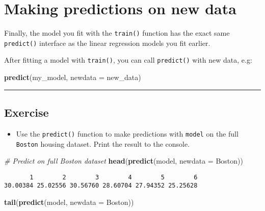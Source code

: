 \documentclass[]{book}
\newenvironment{Shaded}{\begin{snugshade}}{\end{snugshade}}
\newcommand{\KeywordTok}[1]{\textcolor[rgb]{0.13,0.29,0.53}{\textbf{#1}}}
\newcommand{\DataTypeTok}[1]{\textcolor[rgb]{0.13,0.29,0.53}{#1}}
\newcommand{\CommentTok}[1]{\textcolor[rgb]{0.56,0.35,0.01}{\textit{#1}}}
\newcommand{\NormalTok}[1]{#1}
\providecommand{\tightlist}{%
  \setlength{\itemsep}{0pt}\setlength{\parskip}{0pt}}
\begin{document}
\section{Making predictions on new
data}\label{making-predictions-on-new-data}

Finally, the model you fit with the \texttt{train()} function has the
exact same \texttt{predict()} interface as the linear regression models
you fit earlier.

After fitting a model with \texttt{train()}, you can call
\texttt{predict()} with new data, e.g:

\begin{Shaded}
\begin{Highlighting}[]
\KeywordTok{predict}\NormalTok{(my_model, }\DataTypeTok{newdata =}\NormalTok{ new_data)}
\end{Highlighting}
\end{Shaded}

\begin{center}\rule{0.5\linewidth}{\linethickness}\end{center}

\subsection*{Exercise}\label{exercise-8}

\begin{itemize}
\tightlist
\item
  Use the \texttt{predict()} function to make predictions with
  \texttt{model} on the full \texttt{Boston} housing dataset. Print the
  result to the console.
\end{itemize}

\begin{Shaded}
\begin{Highlighting}[]
\CommentTok{# Predict on full Boston dataset}
\KeywordTok{head}\NormalTok{(}\KeywordTok{predict}\NormalTok{(model, }\DataTypeTok{newdata =}\NormalTok{ Boston))}
\end{Highlighting}
\end{Shaded}

\begin{verbatim}
       1        2        3        4        5        6 
30.00384 25.02556 30.56760 28.60704 27.94352 25.25628 
\end{verbatim}

\begin{Shaded}
\begin{Highlighting}[]
\KeywordTok{tail}\NormalTok{(}\KeywordTok{predict}\NormalTok{(model, }\DataTypeTok{newdata =}\NormalTok{ Boston))}
\end{Highlighting}
\end{Shaded}
\end{document}
